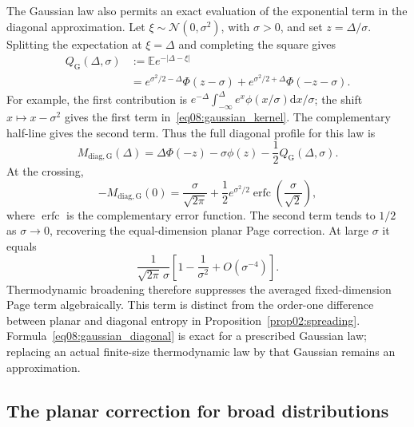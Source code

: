 \documentclass[11pt,letterpaper]{article}
\newcommand{\E}{\mathbb{E}}
\newcommand{\dd}{\mathrm{d}}
\theoremstyle{plain}
\theoremstyle{definition}
\theoremstyle{remark}
\begin{document}
The Gaussian law also permits an exact evaluation of the exponential term in the diagonal approximation. Let $\xi\sim\mathcal N(0,\sigma^2)$, with $\sigma>0$, and set $z=\Delta/\sigma$. Splitting the expectation at $\xi=\Delta$ and completing the square gives
\begin{align}
 Q_{\mathrm G}(\Delta,\sigma)
 &:=\E e^{-|\Delta-\xi|}\nonumber\\
 &=e^{\sigma^2/2-\Delta}\Phi(z-\sigma)
   +e^{\sigma^2/2+\Delta}\Phi(-z-\sigma).
 \label{eq08:gaussian_kernel}
\end{align}
For example, the first contribution is
$e^{-\Delta}\int_{-\infty}^{\Delta}e^x\phi(x/\sigma)\dd x/\sigma$;
the shift $x\mapsto x-\sigma^2$ gives the first term in~\eqref{eq08:gaussian_kernel}. The complementary half-line gives the second term. Thus the full diagonal profile for this law is
\begin{equation}
 M_{\mathrm{diag,G}}(\Delta)
 =\Delta\Phi(-z)-\sigma\phi(z)-\frac12Q_{\mathrm G}(\Delta,\sigma).
 \label{eq08:gaussian_diagonal}
\end{equation}
At the crossing,
\begin{equation}
 -M_{\mathrm{diag,G}}(0)
 =\frac{\sigma}{\sqrt{2\pi}}
 +\frac12 e^{\sigma^2/2}
       \operatorname{erfc}\!\left(\frac{\sigma}{\sqrt2}\right),
 \label{eq08:gaussian_diagonal_center}
\end{equation}
where $\operatorname{erfc}$ is the complementary error function. The second term tends to $1/2$ as $\sigma\to0$, recovering the equal-dimension planar Page correction. At large $\sigma$ it equals
\begin{equation}
 \frac{1}{\sqrt{2\pi}\,\sigma}
 \left[1-\frac{1}{\sigma^2}+O(\sigma^{-4})\right].
 \label{eq08:gaussian_kernel_large_width}
\end{equation}
Thermodynamic broadening therefore suppresses the averaged fixed-dimension Page term algebraically. This term is distinct from the order-one difference between planar and diagonal entropy in Proposition~\ref{prop02:spreading}. Formula~\eqref{eq08:gaussian_diagonal} is exact for a prescribed Gaussian law; replacing an actual finite-size thermodynamic law by that Gaussian remains an approximation.

\subsection{The planar correction for broad distributions}
\end{document}
